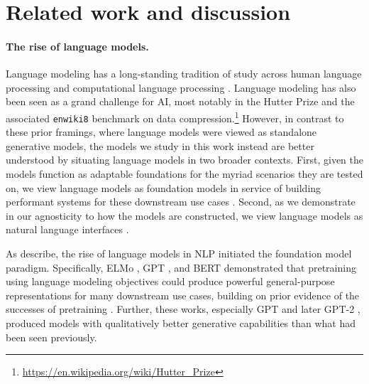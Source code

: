 \hypertarget{discussion}{\section{Related work and discussion}}
\label{sec:discussion}

\paragraph{The rise of language models.}

Language modeling has a long-standing tradition of study across human language processing and computational language processing \citep{shannon1948mathematical, lounsbury1954transitional, goldman1958speech, baker1975stochastic, baker1975dragon, jelinek1976continuous, jelinek1990self, hale2001probabilistic, levy2008expectation, merity2018analysis, radford2018improving, devlin2019bert, brown2020gpt3, chowdhery2022palm}.
Language modeling has also been seen as a grand challenge for AI, most notably in the Hutter Prize and the associated \texttt{enwiki8} benchmark on data compression.\footnote{\url{https://en.wikipedia.org/wiki/Hutter\_Prize}}
However, in contrast to these prior framings, where language models were viewed as standalone generative models, the models we study in this work instead are better understood by situating language models in two broader contexts. 
First, given the models function as adaptable foundations for the myriad scenarios they are tested on, we view language models as foundation models in service of building performant systems for these downstream use cases \citep{bommasani2021opportunities}.
Second, as we demonstrate in our agnosticity to how the models are constructed, we view language models as natural language interfaces \citep[see][]{lee2022interaction}. 

As \citet[][\S1.1]{bommasani2021opportunities} describe, the rise of language models in NLP initiated the foundation model paradigm.
Specifically, ELMo \citep{peters2018elmo}, GPT \citep{radford2018improving}, and BERT \citep{devlin2019bert} demonstrated that pretraining using language modeling objectives could produce powerful general-purpose representations for many downstream use cases, building on prior evidence of the successes of pretraining \citep{mikolov2013efficient, pennington2014glove}.
Further, these works, especially GPT and later GPT-2 \citep{radford2019language}, produced models with qualitatively better generative capabilities than what had been seen previously. 


